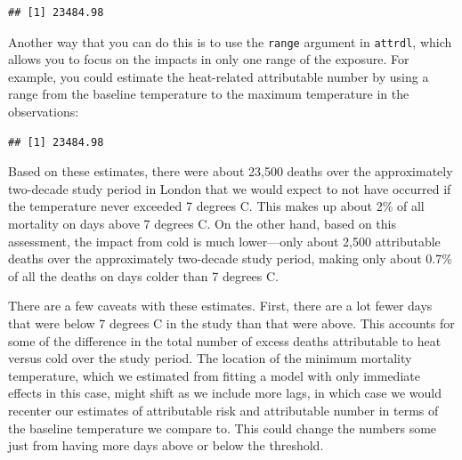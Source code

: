 \documentclass[
]{book}
\newenvironment{Shaded}{\begin{snugshade}}{\end{snugshade}}
\newcommand{\DataTypeTok}[1]{\textcolor[rgb]{0.13,0.29,0.53}{#1}}
\newcommand{\DecValTok}[1]{\textcolor[rgb]{0.00,0.00,0.81}{#1}}
\newcommand{\KeywordTok}[1]{\textcolor[rgb]{0.13,0.29,0.53}{\textbf{#1}}}
\newcommand{\NormalTok}[1]{#1}
\newcommand{\OperatorTok}[1]{\textcolor[rgb]{0.81,0.36,0.00}{\textbf{#1}}}
\newcommand{\StringTok}[1]{\textcolor[rgb]{0.31,0.60,0.02}{#1}}
\begin{document}
\begin{verbatim}
## [1] 23484.98
\end{verbatim}

Another way that you can do this is to use the \texttt{range} argument in \texttt{attrdl}, which allows you to focus on the impacts in only one range of the exposure. For example, you could estimate the heat-related attributable number by using a range from the baseline temperature to the maximum temperature in the observations:

\begin{Shaded}
\end{Shaded}

\begin{verbatim}
## [1] 23484.98
\end{verbatim}

Based on these estimates, there were about 23,500 deaths over the approximately two-decade study period in London that we would expect to not have occurred if the temperature never exceeded 7 degrees C. This makes up about 2\% of all mortality on days above 7 degrees C. On the other hand, based on this assessment, the impact from cold is much lower---only about 2,500 attributable deaths over the approximately two-decade study period, making only about 0.7\% of all the deaths on days colder than 7 degrees C.

There are a few caveats with these estimates. First, there are a lot fewer days that were below 7 degrees C in the study than that were above. This accounts for some of the difference in the total number of excess deaths attributable to heat versus cold over the study period. The location of the minimum mortality temperature, which we estimated from fitting a model with only immediate effects in this case, might shift as we include more lags, in which case we would recenter our estimates of attributable risk and attributable number in terms of the baseline temperature we compare to. This could change the numbers some just from having more days above or below the threshold.
\end{document}
